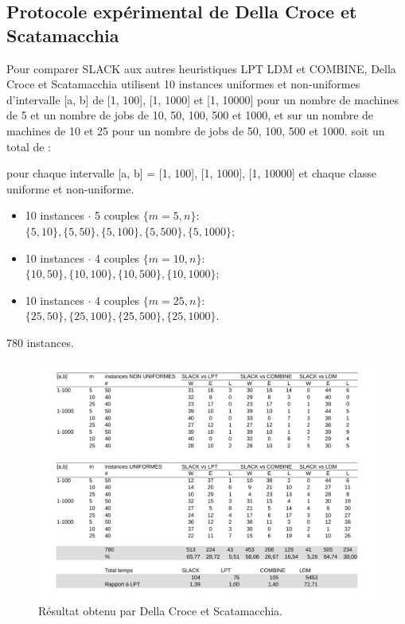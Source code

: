 \documentclass[a4paper,12pt]{report}
\theoremstyle{plain}				%
\theoremstyle{definition}				%
\newcommand\dcs{Della Croce et Scatamacchia\xspace}
\newcommand{\lp}[1]{\todo[author=LP,color=yellow,inline]{#1}}
\begin{document}
\subsection{Protocole expérimental de Della Croce et Scatamacchia}
\label{ssec:resultatsPrtocoleExperimentalDellaCroceScatamacchia}
 
Pour comparer SLACK aux autres heuristiques LPT LDM et COMBINE, \dcs 
 utilisent 10 instances uniformes et non-uniformes d'intervalle [a, b] de [1, 100], [1, 1000] et [1, 10000] 
 pour un nombre de machines de 5 et un nombre de jobs de 10, 50, 100, 500 et 1000, et sur un nombre de machines de 10 et 25 pour un nombre de jobs de 50, 100, 500 et 1000.
soit un total de : 

pour chaque intervalle [a, b] = [1, 100], [1, 1000], [1, 10000] et
  chaque classe uniforme et non-uniforme. 
\begin{itemize}
\item 10 instances $\cdot$ 5 couples $\{m=5,n\}$: \\ $\{5,10\},\{5,50\},\{5,100\},\{5,500\},\{5,1000\}$;
\item 10 instances $\cdot$ 4 couples $\{m=10, n\}$: \\ $\{10,50\},\{10,100\},\{10,500\},\{10,1000\}$;
\item 10 instances $\cdot$ 4 couples $\{m=25,n\}$: \\ $\{25,50\},\{25,100\},\{25,500\},\{25,1000\}$.
\end{itemize}  

780 instances.


\begin{figure}
{\centering
\includegraphics[width=\columnwidth]{1_Resultat_De_DCS.pdf}
\caption{Résultat obtenu par Della Croce et Scatamacchia.}
\label{fig:resultatDellaCroceScatamacchia}
\par}
\end{figure}
\end{document}

